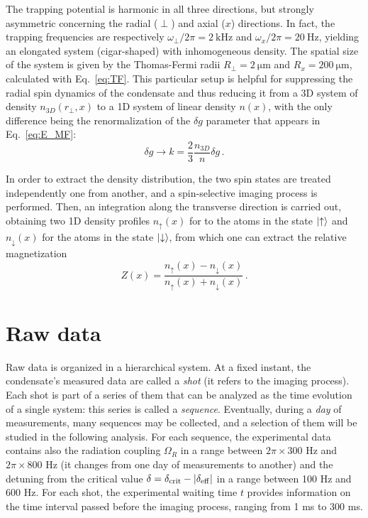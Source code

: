 The trapping potential is harmonic in all three directions, but strongly asymmetric concerning the radial ($\perp$) and axial ($x$) directions. In fact, the trapping frequencies are respectively $\omega_\perp/2\pi = 2\ \unit{\kilo\hertz}$ and $\omega_x/2\pi = 20\ \unit{\hertz}$, yielding an elongated system (cigar-shaped) with inhomogeneous density. The spatial size of the system is given by the Thomas-Fermi radii $R_\perp = 2\ \unit{\micro\meter}$ and $R_x = 200\ \unit{\micro\meter}$, calculated with Eq.\ \eqref{eq:TF}. This particular setup is helpful for suppressing the radial spin dynamics of the condensate and thus reducing it from a 3D system of density $n_{3D}(r_\perp,x)$ to a 1D system of linear density $n(x)$, with the only difference being the renormalization of the $\delta g$ parameter that appears in Eq.\ \eqref{eq:E_MF}:
\[
    \delta g \to k = \frac{2}{3}\frac{n_{3D}}{n}\delta g\, .
\]

In order to extract the density distribution, the two spin states are treated independently one from another, and a spin-selective imaging process is performed. Then, an integration along the transverse direction is carried out, obtaining two 1D density profiles $n_\uparrow(x)$ for to the atoms in the state $\ket{\uparrow}$ and $n_\downarrow(x)$ for the atoms in the state $\ket{\downarrow}$, from which one can extract the relative magnetization
\begin{equation}
    Z(x) = \frac{n_\uparrow(x) - n_\downarrow(x)}{n_\uparrow(x) + n_\downarrow(x)}\, .
    \label{eq:magnetization}
\end{equation}

\section{Raw data}
Raw data is organized in a hierarchical system. At a fixed instant, the condensate's measured data are called a \emph{shot} (it refers to the imaging process). Each shot is part of a series of them that can be analyzed as the time evolution of a single system: this series is called a \emph{sequence}. Eventually, during a \emph{day} of measurements, many sequences may be collected, and a selection of them will be studied in the following analysis. For each sequence, the experimental data contains also the radiation coupling $\Omega_R$ in a range between $2\pi \times 300$ \unit{\hertz} and $2\pi \times 800$ \unit{\hertz} (it changes from one day of measurements to another) and the detuning from the critical value $\delta = \delta_{\rm crit} - |\delta_{\rm eff}|$ in a range between 100 \unit{\hertz} and 600 \unit{\hertz}. For each shot, the experimental waiting time $t$ provides information on the time interval passed before the imaging process, ranging from 1 \unit{\milli\second} to 300 \unit{\milli\second}. 

